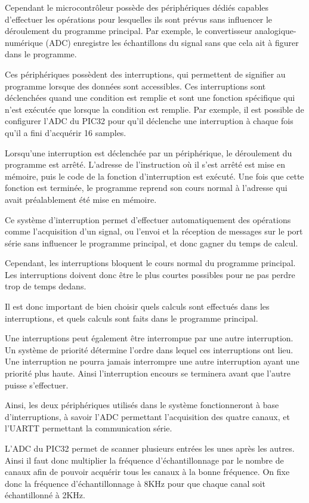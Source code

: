 \documentclass[letterpaper, twoside, 12pt, memoire, creativecommons, hyperref]{thETS}
\begin{document}
Cependant le microcontrôleur possède des périphériques dédiés capables d'effectuer les opérations pour lesquelles ils sont prévus sans influencer le déroulement du programme principal. Par exemple, le convertisseur analogique-numérique (ADC) enregistre les échantillons du signal sans que cela ait à figurer dans le programme. 

Ces périphériques possèdent des interruptions, qui permettent de signifier au programme lorsque des données sont accessibles. Ces interruptions sont déclenchées quand une condition est remplie et sont une fonction spécifique qui n'est exécutée que lorsque la condition est remplie. Par exemple, il est possible de configurer l'ADC du PIC32 pour qu'il déclenche une interruption à chaque fois qu'il a fini d'acquérir 16 samples. 

Lorsqu'une interruption est déclenchée par un périphérique, le déroulement du programme est arrêté. L'adresse de l'instruction où il s'est arrêté est mise en mémoire, puis le code de la fonction d'interruption est exécuté. Une fois que cette fonction est terminée, le programme reprend son cours normal à l'adresse qui avait préalablement été mise en mémoire. 

Ce système d'interruption permet d'effectuer automatiquement des opérations comme l'acquisition d'un signal, ou l'envoi et la réception de messages sur le port série sans influencer le programme principal, et donc gagner du temps de calcul. 

Cependant, les interruptions bloquent le cours normal du programme principal. Les interruptions doivent donc être le plus courtes possibles pour ne pas perdre trop de temps dedans. 

Il est donc important de bien choisir quels calculs sont effectués dans les interruptions, et quels calculs sont faits dans le programme principal. 

Une interruptions peut également être interrompue par une autre interruption. Un système de priorité détermine l'ordre dans lequel ces interruptions ont lieu. Une interruption ne pourra jamais interrompre une autre interruption ayant une priorité plus haute. Ainsi l'interruption encours se terminera avant que l'autre puisse s'effectuer. 

Ainsi, les deux périphériques utilisés dans le système fonctionneront à base d'interruptions, à savoir l'ADC permettant l'acquisition des quatre canaux, et l'UARTT permettant la communication série. 

L'ADC du PIC32 permet de scanner plusieurs entrées les unes après les autres. Ainsi il faut donc multiplier la fréquence d'échantillonnage par le nombre de canaux afin de pouvoir acquérir tous les canaux à la bonne fréquence. On fixe donc la fréquence d'échantillonnage à 8KHz pour que chaque canal soit échantillonné à 2KHz. 
\end{document}
